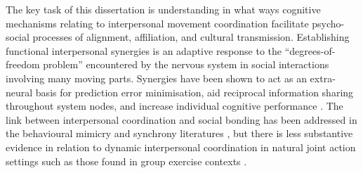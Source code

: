 The key task of this dissertation is understanding in what ways cognitive mechanisms relating to interpersonal movement coordination facilitate psycho-social processes of alignment, affiliation, and cultural transmission\citep{Marsh2009}.  Establishing functional interpersonal synergies is an adaptive response to the ``degrees-of-freedom problem'' encountered by the nervous system in social interactions involving many moving parts.  Synergies have been shown to act as an extra-neural basis for prediction error minimisation, aid reciprocal information sharing throughout system nodes, and increase individual cognitive performance \citep{Schmidt2016}.  The link between interpersonal coordination and social bonding has been addressed in the behavioural mimicry and synchrony literatures \citep[e.g.,][]{Wheatley2012,Launay2016,Mogan2017}, but there is less substantive evidence in relation to dynamic interpersonal coordination in natural joint action settings such as those found in group exercise contexts \citep{Marsh2009,Miles2009,Lumsden2012}.

